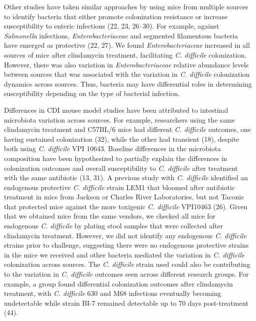 \documentclass[
  11pt,
]{article}
\begin{document}
Other studies have taken similar approaches by using mice from multiple
sources to identify bacteria that either promote colonization resistance
or increase susceptibility to enteric infections (22, 23, 26--30). For
example, against \emph{Salmonella} infections, \emph{Enterobacteriaceae}
and segmented filamentous bacteria have emerged as protective (22, 27).
We found \emph{Enterobacteriaceae} increased in all sources of mice
after clindamycin treatment, facilitating \emph{C. difficile}
colonization. However, there was also variation in
\emph{Enterobacteriaceae} relative abundance levels between sources that
was associated with the variation in \emph{C. difficile} colonization
dynamics across sources. Thus, bacteria may have differential roles in
determining susceptibility depending on the type of bacterial infection.

Differences in CDI mouse model studies have been attributed to
intestinal microbiota variation across sources. For example, researchers
using the same clindamycin treatment and C57BL/6 mice had different
\emph{C. difficile} outcomes, one having sustained colonization (32),
while the other had transient (18), despite both using \emph{C.
difficile} VPI 10643. Baseline differences in the microbiota composition
have been hypothesized to partially explain the differences in
colonization outcomes and overall susceptibility to \emph{C. difficile}
after treatment with the same antibiotic (13, 31). A previous study with
\emph{C. difficile} identified an endogenous protective \emph{C.
difficile} strain LEM1 that bloomed after antibiotic treatment in mice
from Jackson or Charles River Laboratories, but not Taconic that
protected mice against the more toxigenic \emph{C. difficile} VPI10463
(26). Given that we obtained mice from the same vendors, we checked all
mice for endogenous \emph{C. difficile} by plating stool samples that
were collected after clindamycin treatment. However, we did not identify
any endogenous \emph{C. difficile} strains prior to challenge,
suggesting there were no endogenous protective strains in the mice we
received and other bacteria mediated the variation in \emph{C.
difficile} colonization across sources. The \emph{C. difficile} strain
used could also be contributing to the variation in \emph{C. difficile}
outcomes seen across different research groups. For example, a group
found differential colonization outcomes after clindamycin treatment,
with \emph{C. difficile} 630 and M68 infections eventually becoming
undetectable while strain BI-7 remained detectable up to 70 days
post-treatment (44).
\end{document}
